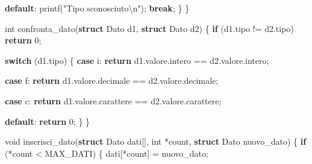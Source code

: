 \documentclass[
  letterpaper,
]{scrbook}
\newenvironment{Shaded}{\begin{snugshade}}{\end{snugshade}}
\newcommand{\CharTok}[1]{\textcolor[rgb]{0.13,0.47,0.30}{#1}}
\newcommand{\ControlFlowTok}[1]{\textcolor[rgb]{0.00,0.23,0.31}{\textbf{#1}}}
\newcommand{\DataTypeTok}[1]{\textcolor[rgb]{0.68,0.00,0.00}{#1}}
\newcommand{\DecValTok}[1]{\textcolor[rgb]{0.68,0.00,0.00}{#1}}
\newcommand{\KeywordTok}[1]{\textcolor[rgb]{0.00,0.23,0.31}{\textbf{#1}}}
\newcommand{\NormalTok}[1]{\textcolor[rgb]{0.00,0.23,0.31}{#1}}
\newcommand{\OperatorTok}[1]{\textcolor[rgb]{0.37,0.37,0.37}{#1}}
\newcommand{\SpecialCharTok}[1]{\textcolor[rgb]{0.37,0.37,0.37}{#1}}
\newcommand{\StringTok}[1]{\textcolor[rgb]{0.13,0.47,0.30}{#1}}
\newcommand*\circled[1]{\tikz[baseline=(char.base)]{
          \node[shape=circle,draw,inner sep=1pt] (char) {{\scriptsize#1}};}}
\begin{document}
\begin{Shaded}
\begin{Highlighting}[]
    \ControlFlowTok{default}\OperatorTok{:}
\NormalTok{      printf}\OperatorTok{(}\StringTok{"Tipo sconosciuto}\SpecialCharTok{\textbackslash{}n}\StringTok{"}\OperatorTok{);}
      \ControlFlowTok{break}\OperatorTok{;}
  \OperatorTok{\}}
\OperatorTok{\}}

\DataTypeTok{int}\NormalTok{ confronta\_dato}\OperatorTok{(}\KeywordTok{struct}\NormalTok{ Dato d1}\OperatorTok{,} \KeywordTok{struct}\NormalTok{ Dato d2}\OperatorTok{)} \OperatorTok{\{}
  \ControlFlowTok{if} \OperatorTok{(}\NormalTok{d1}\OperatorTok{.}\NormalTok{tipo }\OperatorTok{!=}\NormalTok{ d2}\OperatorTok{.}\NormalTok{tipo}\OperatorTok{)} \ControlFlowTok{return} \DecValTok{0}\OperatorTok{;}

  \ControlFlowTok{switch} \OperatorTok{(}\NormalTok{d1}\OperatorTok{.}\NormalTok{tipo}\OperatorTok{)} \OperatorTok{\{}
    \ControlFlowTok{case} \CharTok{\textquotesingle{}i\textquotesingle{}}\OperatorTok{:} \ControlFlowTok{return}\NormalTok{ d1}\OperatorTok{.}\NormalTok{valore}\OperatorTok{.}\NormalTok{intero }\OperatorTok{==}\NormalTok{ d2}\OperatorTok{.}\NormalTok{valore}\OperatorTok{.}\NormalTok{intero}\OperatorTok{;}

    \ControlFlowTok{case} \CharTok{\textquotesingle{}f\textquotesingle{}}\OperatorTok{:} \ControlFlowTok{return}\NormalTok{ d1}\OperatorTok{.}\NormalTok{valore}\OperatorTok{.}\NormalTok{decimale }\OperatorTok{==}\NormalTok{ d2}\OperatorTok{.}\NormalTok{valore}\OperatorTok{.}\NormalTok{decimale}\OperatorTok{;}

    \ControlFlowTok{case} \CharTok{\textquotesingle{}c\textquotesingle{}}\OperatorTok{:} \ControlFlowTok{return}\NormalTok{ d1}\OperatorTok{.}\NormalTok{valore}\OperatorTok{.}\NormalTok{carattere }\OperatorTok{==}\NormalTok{ d2}\OperatorTok{.}\NormalTok{valore}\OperatorTok{.}\NormalTok{carattere}\OperatorTok{;}

    \ControlFlowTok{default}\OperatorTok{:} \ControlFlowTok{return} \DecValTok{0}\OperatorTok{;}
  \OperatorTok{\}}
\OperatorTok{\}}

\DataTypeTok{void}\NormalTok{ inserisci\_dato}\OperatorTok{(}\KeywordTok{struct}\NormalTok{ Dato dati}\OperatorTok{[],} \DataTypeTok{int} \OperatorTok{*}\NormalTok{count}\OperatorTok{,} \KeywordTok{struct}\NormalTok{ Dato nuovo\_dato}\OperatorTok{)} \OperatorTok{\{} \hspace*{\fill}\NormalTok{\circled{4}}
  \ControlFlowTok{if} \OperatorTok{(*}\NormalTok{count }\OperatorTok{\textless{}}\NormalTok{ MAX\_DATI}\OperatorTok{)} \OperatorTok{\{}
\NormalTok{    dati}\OperatorTok{[*}\NormalTok{count}\OperatorTok{]} \OperatorTok{=}\NormalTok{ nuovo\_dato}\OperatorTok{;}


\end{Highlighting}
\end{Shaded}
\end{document}
